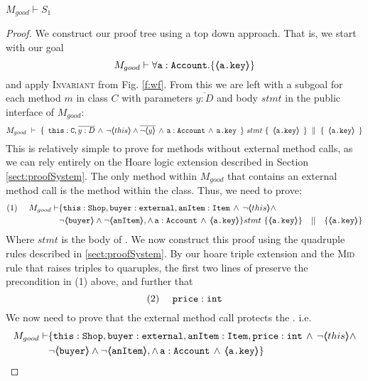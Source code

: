 \begin{lemma}
$M_{good} \vdash S_1$
\end{lemma}
\begin{proof}
We construct our proof tree using a top down approach.  That is, we start with our goal
$$M_{good} \vdash \forall {\mbox{\normalfont{\texttt{a}}}:\mbox{\normalfont{\texttt{Account}}}}.{{\{}}{\langle\!\!\langle \mbox{\normalfont{\texttt{a.key}}} \rangle\!\!\rangle}{{\}}}$$
and apply  \textsc{Invariant} from Fig. \ref{f:wf}.
From this we are left with a subgoal for each method $m$ in  class $C$ with parameters $\overline{y:D}$ and body $stmt$ in the public interface of $M_{good}$:
\small
$$\hprovesN{M_{good}} { \ \prg{this}:\prg{C}, \overline{y:D}\, \wedge\, \neg\inside{this}\wedge\overline{ \neg\inside{y}}\, \wedge\, \prg{a} : \prg{Account}\, \wedge\,  \prg{a.key}\  } {\ stmt\ } {\ \inside{\prg{a.key}}\ } {\ \inside{\prg{a.key}} \ } $$
\normalsize
This is relatively simple to prove for methods without external method calls, as we can rely entirely on the Hoare logic extension described in Section \ref{sect:proofSystem}. The only  method within $M_{good}$ that contains 
an external method call is  the  method within the  class. Thus, we need to prove:
\small
\begin{align*}
\text{(1)} \ \ \ \ M_{good} \vdash & \{  \prg{this}:\prg{Shop}, \prg{buyer} : \prg{external}, \prg{anItem} : \prg{Item} \, \wedge\, \neg\inside{this}\wedge \\ 
		&\neg\inside{\prg{buyer}} \wedge \neg\inside{\prg{anItem}}, \wedge\, \prg{a} : \prg{Account}\, \wedge\,  \inside{\prg{a.key}} \} 
		 stmt\ \{ \inside{\prg{a.key}} \} \ \ \  || \ \ \ \{ \inside{\prg{a.key}} \}
\end{align*}
\normalsize
Where $stmt$ is the body of . We now construct this proof using the quadruple rules described in \ref{sect:proofSystem}. By our hoare triple extension and the \textsc{Mid} rule that raises triples to quaruples, the first two lines
of  preserve the precondition in (1) above, and further that 
\small
$$
\text{(2)} \ \ \ \ \mbox{\normalfont{\texttt{price}}} : \mbox{\normalfont{\texttt{int}}}
$$ 
We now need to prove that the external method call  protects the . i.e.
\small
\begin{align*}
M_{good} \vdash & \{  \prg{this}:\prg{Shop}, \prg{buyer} : \prg{external}, \prg{anItem} : \prg{Item}, \prg{price} : \prg{int} \, \wedge\, \neg\inside{this}\wedge \\ 
		&\neg\inside{\prg{buyer}} \wedge \neg\inside{\prg{anItem}}, \wedge\, \prg{a} : \prg{Account}\, \wedge\,  \inside{\prg{a.key}} \}  \\

\end{align*}
\end{proof}
